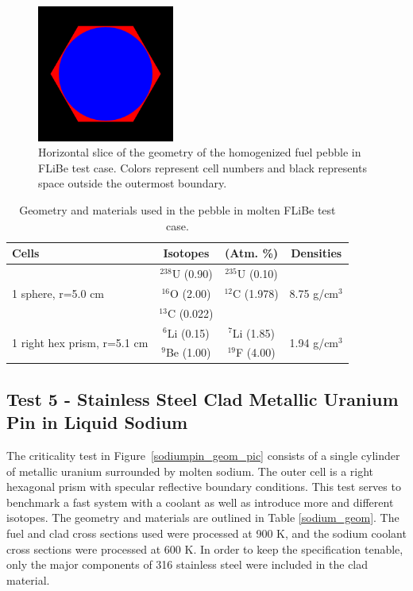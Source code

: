 \documentclass[preprint,12pt]{elsarticle}
\begin{document}
\begin{figure}[h!] 
  \centering
    \includegraphics[width=0.4\textwidth]{graphics/flibe-xy.png}
     \caption{ Horizontal slice of the geometry of the homogenized fuel pebble in FLiBe test case.  Colors represent cell numbers and black represents space outside the outermost boundary. \label{flibe_geom_pic} }
\end{figure}

\begin{table}[h]
\centering
\caption{Geometry and materials used in the pebble in molten FLiBe test case.}
\label{pebble_geom}
\begin{tabular}{| l | c  c | c |}
\hline
Cells & Isotopes & (Atm.  \%)& Densities \\
\hline
\multirow{3}{*}{1 sphere, r=5.0 cm }  &   $^{238}$U   (0.90) &  $^{235}$U   (0.10) &  \multirow{3}{*}{8.75 g/cm$^3$} \\
                                      &   $^{16}$O    (2.00) &  $^{12}$C    (1.978) &  \\
                                      &   $^{13}$C    (0.022)&                     &  \\
\hline
\multirow{2}{*}{1 right hex prism, r=5.1 cm }  &   $^{6}$Li  (0.15) &  $^{7}$Li  (1.85)&  \multirow{2}{*}{1.94 g/cm$^3$} \\
                                               &  $^{9}$Be  (1.00) & $^{19}$F  (4.00) &  \\
\hline
\end{tabular}
\end{table}

\newpage
\subsection{Test 5 - Stainless Steel Clad Metallic Uranium Pin in Liquid Sodium}

The criticality test in Figure~\ref{sodiumpin_geom_pic} consists of a single cylinder of metallic uranium surrounded by molten sodium.  The outer cell is a right hexagonal prism with specular reflective boundary conditions.  This test serves to benchmark a fast system with a coolant as well as introduce more and different isotopes.  The geometry and materials are outlined in Table \ref{sodium_geom}.  The fuel and clad cross sections used were processed at 900 K, and the sodium coolant cross sections were processed at 600 K.  In order to keep the specification tenable, only the major components of 316 stainless steel were included in the clad material. 
\end{document}
